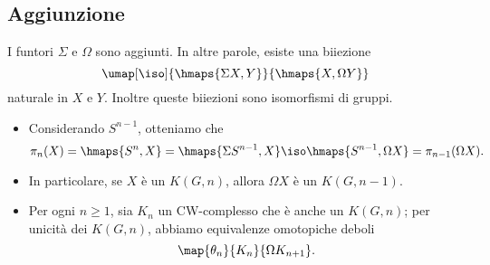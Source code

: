 \subsection*{Aggiunzione}
\begin{frame*}
\begin{proposition}
I funtori $\Sigma$ e $\Omega$ sono aggiunti. In altre parole, esiste una biiezione
\[
\umap[\iso]{\hmaps{\Sigma X,Y}}{\hmaps{X,\Omega Y}}
\]
naturale in $X$ e $Y$. Inoltre queste biiezioni sono isomorfismi di gruppi.
\end{proposition}
\pause
\begin{remarks}
\begin{itemize}[<+->]
\item Considerando $S^{n-1}$, otteniamo che
\[
\pi_n(X)=\hmaps{S^n,X}=\hmaps{\Sigma S^{n-1},X}\iso\hmaps{S^{n-1},\Omega X}=\pi_{n-1}(\Omega X).
\]
\item In particolare, se $X$ è un $K(G,n)$, allora $\Omega X$ è un $K(G,n-1)$.
\item Per ogni $n\ge 1$, sia $K_n$ un CW-complesso che è anche un $K(G,n)$; per unicità dei $K(G,n)$, abbiamo equivalenze omotopiche deboli
\[
\map{\theta_n}{K_n}{\Omega K_{n+1}}.
\]
\end{itemize}
\end{remarks}
\end{frame*}